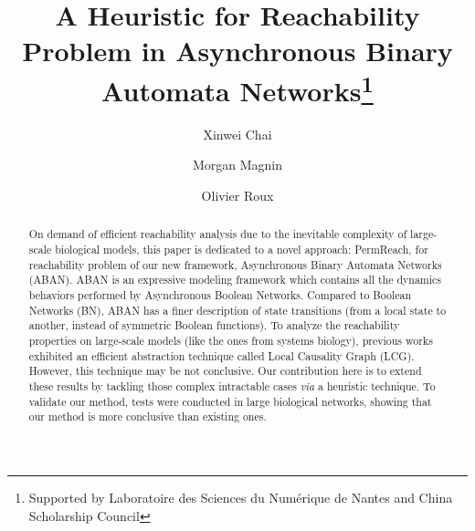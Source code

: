 \documentclass[runningheads]{llncs}
\begin{document}
%
\title{A Heuristic for Reachability Problem in Asynchronous Binary Automata Networks\thanks{Supported by Laboratoire des Sciences du Num\'erique de Nantes and China Scholarship Council}}
%
%
\author{Xinwei Chai\and Morgan Magnin \and Olivier Roux}
%
%
%
\maketitle              %
%
\begin{abstract}
On demand of efficient reachability analysis due to the inevitable complexity of large-scale biological models, this paper is dedicated to a novel approach: PermReach, for reachability problem of our new framework, Asynchronous Binary Automata Networks (ABAN). 
ABAN is an expressive modeling framework which contains all the dynamics behaviors performed by Asynchronous Boolean Networks. 
Compared to Boolean Networks (BN), ABAN has a finer description of state transitions (from a local state to another, instead of symmetric Boolean functions). 
To analyze the reachability properties on large-scale models (like the ones from systems biology), previous works exhibited an efficient abstraction technique called Local Causality Graph (LCG). 
However, this technique may be not conclusive. Our contribution here is to extend these results by tackling those complex intractable cases \textit{via} a heuristic technique. 
To validate our method, tests were conducted in large biological networks, showing that our method is more conclusive than existing ones.
\cite{marx2013}

\end{abstract}
\end{document}
